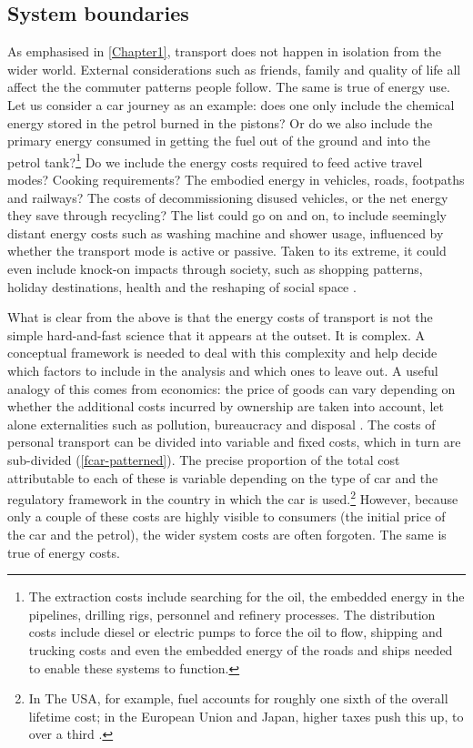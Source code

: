 \subsection{System boundaries} 
As emphasised in \cref{Chapter1}, transport does not happen in isolation from
the wider world. External considerations such as friends, family and quality of
life all affect the the commuter patterns people follow. The same is true of
energy use. Let us consider a car journey as an example: does one only include the
chemical energy stored in the petrol burned in the pistons? Or do we also
include the primary energy consumed in getting the fuel out of the ground and
into the petrol tank?\footnote{The extraction costs include
searching for the oil, the embedded energy in the pipelines, drilling rigs,
personnel and refinery processes. The distribution costs include diesel or
electric pumps to force the oil to flow, shipping and trucking costs and even
the embedded energy of the roads and ships needed to enable these systems to
function.}
Do we include the energy costs required to feed active travel modes? Cooking
requirements? The embodied energy in vehicles, roads, footpaths and railways?
The costs of decommissioning disused vehicles, or the net energy they save
through recycling?
The list could go on and on, to include seemingly distant energy costs such as
washing machine and shower usage, influenced by whether the transport mode is
active or passive. Taken to its extreme, it could even include knock-on impacts
through society, such as shopping patterns, holiday destinations, health and
the reshaping of social space \citep{Illich1974}.

What is clear from the above is that the energy costs of transport is not the
simple hard-and-fast science that it appears at the outset. It is complex. A
conceptual framework is needed to deal with this complexity and help decide
which factors to include in the analysis and which ones to leave out.
A useful analogy of this comes from economics: the price of goods can
vary depending on whether the additional costs incurred by ownership
are taken into account, let alone externalities such as pollution,
bureaucracy and disposal \citep{Perman2003}.
The costs of personal transport can be divided into variable and
fixed costs, which in turn are sub-divided (\cref{fcar-patterned}).
The precise proportion of the total cost attributable to each of these
is variable depending on the type of car and the regulatory framework
in the country in which the car is
used.\footnote{In The USA, for example,
fuel accounts for roughly one sixth of the overall lifetime cost;
in the European Union and Japan, higher taxes push this up, to over a
third \citep{Smil1993}.
}
However, because only a couple of these costs are highly
visible to consumers
(the initial price of the car and the petrol), the wider system costs are often
forgoten. The same is true of energy costs. 

